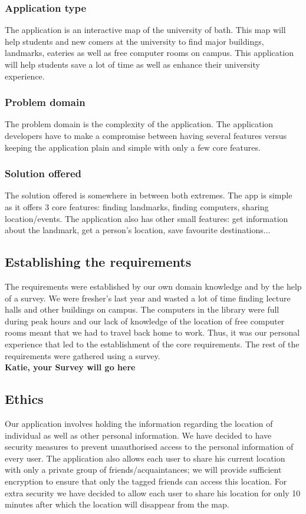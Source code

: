 \documentclass[10pt,a4paper,oneside]{report}
\begin{document}
\subsubsection*{Application type}
 The application is an interactive map of the university of bath. This map will help students and new comers at the university to find major buildings, landmarks, eateries as well as free computer rooms on campus. This application will help students save a lot of time as well as enhance their university experience.

\subsubsection*{Problem domain}
The problem domain is the complexity of the application. The application developers have to make a compromise between having several features versus keeping the application plain and simple with only a few core features.

\subsubsection*{Solution offered}
The solution offered is somewhere in between both extremes. The app is simple as it offers 3 core features: finding landmarks, finding computers, sharing location/events.
The application also has other small features: get information about the landmark, get a person’s location, save favourite destinations...
\subsection*{Establishing the requirements}
The requirements were established by our own domain knowledge and by the help of a survey.
We were fresher’s last year and wasted a lot of time finding lecture halls and other buildings on campus. The computers in the library were full during peak hours and our lack of knowledge of the location of free computer rooms meant that we had to travel back home to work. Thus, it was our personal experience that led to the establishment of the core requirements. The rest of the requirements were gathered using a survey. \\

\textbf{Katie, your Survey will go here}
\clearpage

\subsection*{Ethics}
Our application involves holding the information regarding the location of individual as well as other personal information. We have decided to have security measures to prevent unauthorised access to the personal information of every user. The application also allows each user to share his current location with only a private group of friends/acquaintances; we will provide sufficient encryption to ensure that only the tagged friends can access this location. For extra security we have decided to allow each user to share his location for only 10 minutes after which the location will disappear from the map.
\end{document}
